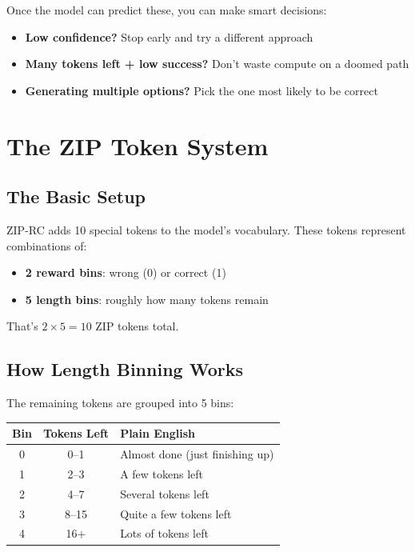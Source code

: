 \documentclass[11pt,a4paper]{article}
\begin{document}
Once the model can predict these, you can make smart decisions:
\begin{itemize}
    \item \textbf{Low confidence?} Stop early and try a different approach
    \item \textbf{Many tokens left + low success?} Don't waste compute on a doomed path
    \item \textbf{Generating multiple options?} Pick the one most likely to be correct
\end{itemize}

\section{The ZIP Token System}

\subsection{The Basic Setup}

ZIP-RC adds 10 special tokens to the model's vocabulary. These tokens represent combinations of:
\begin{itemize}
    \item \textbf{2 reward bins}: wrong (0) or correct (1)
    \item \textbf{5 length bins}: roughly how many tokens remain
\end{itemize}

That's $2 \times 5 = 10$ ZIP tokens total.

\subsection{How Length Binning Works}

The remaining tokens are grouped into 5 bins:

\begin{center}
\begin{tabular}{@{}ccp{5cm}@{}}
\toprule
\textbf{Bin} & \textbf{Tokens Left} & \textbf{Plain English} \\
\midrule
0 & 0--1 & Almost done (just finishing up) \\
1 & 2--3 & A few tokens left \\
2 & 4--7 & Several tokens left \\
3 & 8--15 & Quite a few tokens left \\
4 & 16+ & Lots of tokens left \\
\bottomrule
\end{tabular}
\end{center}
\end{document}
